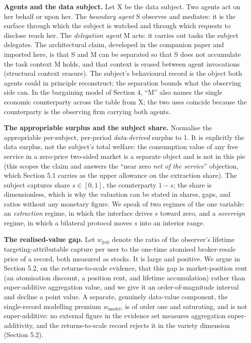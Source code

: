 \documentclass[
  11pt,
]{article}
\begin{document}
\textbf{Agents and the data subject.} Let X be the data subject. Two
agents act on her behalf or upon her. The \emph{boundary agent} S
observes and mediates: it is the surface through which the subject is
watched and through which requests to disclose reach her. The
\emph{delegation agent} M acts: it carries out tasks the subject
delegates. The architectural claim, developed in the companion paper and
imported here, is that S and M can be separated so that S does not
accumulate the task context M holds, and that context is erased between
agent invocations (structural context erasure). The subject's
behavioural record is the object both agents could in principle
reconstruct; the separation bounds what the observing side can. In the
bargaining model of Section 4, ``M'' also names the single economic
counterparty across the table from X; the two uses coincide because the
counterparty is the observing firm carrying both agents.

\textbf{The appropriable surplus and the subject share.} Normalise the
appropriable per-subject, per-period \emph{data-derived} surplus to 1.
It is explicitly the data surplus, not the subject's total welfare: the
consumption value of any free service in a zero-price two-sided market
is a separate object and is not in this pie (this scopes the claim and
answers the ``near zero \emph{net of the service}'' objection, which
Section 5.1 carries as the upper allowance on the extraction share). The
subject captures share \(s \in [0,1]\), the counterparty \(1-s\); the
share is dimensionless, which is why the valuation can be stated in
shares, gaps, and ratios without any monetary figure. We speak of two
regimes of the one variable: an \emph{extraction} regime, in which the
interface drives \(s\) toward zero, and a \emph{sovereign} regime, in
which a bilateral protocol moves \(s\) into an interior range.

\textbf{The realised-value gap.} Let \(w_{\text{gap}}\) denote the ratio
of the observer's lifetime targeting-attributable capture per user to
the one-time atomised broker-resale price of a record, both measured as
stocks. It is large and positive. We argue in Section 5.2, on the
returns-to-scale evidence, that this gap is market-position rent (an
atomisation discount, a position rent, and lifetime accumulation) rather
than super-additive aggregation value, and we give it an
order-of-magnitude interval and decline a point value. A separate,
genuinely data-value component, the single-record modelling premium
\(w_{\text{model}}\), is of order one and saturating, and is not
super-additive: no external figure in the evidence set measures
aggregation super-additivity, and the returns-to-scale record rejects it
in the variety dimension (Section 5.2).
\end{document}
